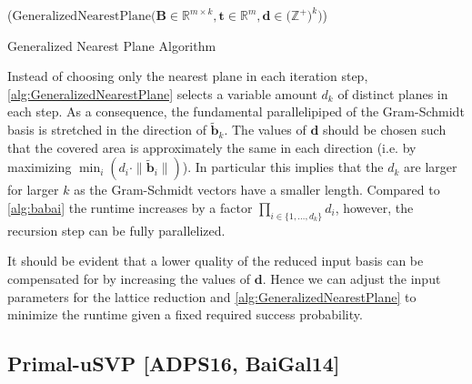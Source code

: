 \begin{algorithm2e}
  \Begin($\text{GeneralizedNearestPlane} {(} \mathbf{B} \in \mathbb{R}^{m \times k},\mathbf{t} \in \mathbb{R}^{m}, \mathbf{d} \in {(}\mathbb{Z}^+{)}^k {)}$) 
  { %
  }
\caption{Generalized Nearest Plane Algorithm \cite{LP11}}\label{alg:GeneralizedNearestPlane}
\end{algorithm2e}
Instead of choosing only the nearest plane in each iteration step, \cref{alg:GeneralizedNearestPlane} selects a variable amount $d_k$ of distinct planes in each step. As a consequence, the fundamental parallelipiped of the Gram-Schmidt basis is stretched in the direction of $\tilde{\mathbf{b}}_k$. The values of $\mathbf{d}$ should be chosen such that the covered area is approximately the same in each direction (i.e. by maximizing $\min_i(d_i \cdot \|\tilde{\mathbf{b}}_i\|)$). In particular this implies that the $d_k$ are larger for larger $k$ as the Gram-Schmidt vectors have a smaller length. %
Compared to \cref{alg:babai} the runtime increases by a factor $\prod_{i \in \{1, \dots, d_k\}} d_i$, however, the recursion step can be fully parallelized.

It should be evident that a lower quality of the reduced input basis can be compensated for by increasing the values of $\mathbf{d}$. Hence we can adjust the input parameters for the lattice reduction and \cref{alg:GeneralizedNearestPlane} to minimize the runtime given a fixed required success probability. %




\subsection{Primal-uSVP [ADPS16, BaiGal14]} %

